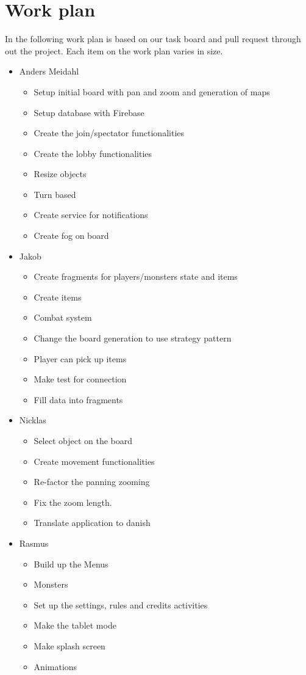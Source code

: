 \pagestyle{Uni}

\chapter{Work plan}
In the following work plan is based on our task board and pull request through out the project. Each item on the work plan varies in size.

\begin{itemize}
	\item Anders Meidahl
	\begin{itemize}
		\item Setup initial board with pan and zoom and generation of maps
		\item Setup database with Firebase
		\item Create the join/spectator functionalities
		\item Create the lobby functionalities
		\item Resize objects
		\item Turn based
		\item Create service for notifications
		\item Create fog on board
	\end{itemize}
	
	\item Jakob
	\begin{itemize}
		\item Create fragments for players/monsters state and items
		\item Create items
		\item Combat system
		\item Change the board generation to use strategy pattern
		\item Player can pick up items
		\item Make test for connection
		\item Fill data into fragments
	\end{itemize}
	\item Nicklas
	\begin{itemize}
		\item Select object on the board
		\item Create movement functionalities
		\item Re-factor the panning zooming
		\item Fix the zoom length.
		\item Translate application to danish
	\end{itemize}
	\item Rasmus
	\begin{itemize}
		\item Build up the Menus
		\item Monsters
		\item Set up the settings, rules and credits activities
		\item Make the tablet mode
		\item Make splash screen
		\item Animations
	\end{itemize}
\end{itemize}